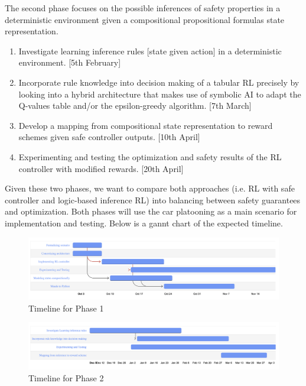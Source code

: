 \documentclass[a4paper,11pt]{article}
\begin{document}
The second phase focuses on the possible inferences of safety properties in a deterministic environment given a compositional propositional formulas
state representation. 
\begin{enumerate}
  \item Investigate learning inference rules [state given action] in a deterministic environment. [5th February]
  \item Incorporate rule knowledge into decision making of a tabular RL precisely by looking into a hybrid architecture that makes use of 
        symbolic AI to adapt the Q-values table and/or the epsilon-greedy algorithm. [7th March]
  \item Develop a mapping from compositional state representation to reward schemes given safe controller outputs. [10th April]
  \item Experimenting and testing the optimization and safety results of the RL controller with modified rewards. [20th April]
\end{enumerate}

Given these two phases, we want to compare both approaches (i.e. RL with safe controller and logic-based inference RL) into balancing between safety guarantees and optimization. 
Both phases will use the car platooning as a main scenario for implementation and testing. Below is a gannt chart of the expected timeline. \newline 


\begin{figure}[H]
\includegraphics[scale=0.18]{phase-1.png}  
\caption{Timeline for Phase 1}
\label{fig:phase-1}
\end{figure}

\begin{figure}[H]
\includegraphics[scale=0.18]{phase-2.png}
\caption{Timeline for Phase 2}
\label{fig:phase-2}
\end{figure}

\newpage



\end{document}
